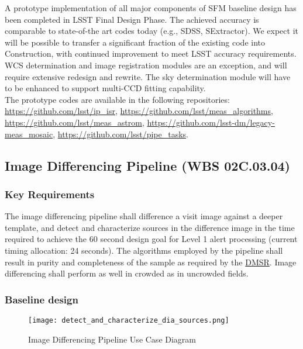 \documentclass[12pt]{article}
\newcommand{\ds}[2]{{\color{blue} \href{https://docushare.lsstcorp.org/docushare/dsweb/Get/#1}{#2}}\xspace}
\newcommand{\DMSR}{\ds{LSE-61}{DMSR}}
\newcommand{\wbsDiffim}{WBS 02C.03.04}
\begin{document}
A prototype implementation of all major components of SFM baseline design has been completed in LSST Final Design Phase. The achieved accuracy is comparable to state-of-the art codes today (e.g., SDSS, SExtractor). We expect it will be possible to transfer a significant fraction of the existing code into Construction, with continued improvement to meet LSST accuracy requirements.
\\

WCS determination and image registration modules are an exception, and will require extensive redesign and rewrite. The sky determination module will have to be enhanced to support multi-CCD fitting capability.
\\

The prototype codes are available in the following repositories: \url{https://github.com/lsst/ip_isr}, \url{https://github.com/lsst/meas_algorithms}, \url{https://github.com/lsst/meas_astrom}, \url{https://github.com/lsst-dm/legacy-meas_mosaic}, \url{https://github.com/lsst/pipe_tasks}.

\clearpage

\subsection{Image Differencing Pipeline (\wbsDiffim)}

\subsubsection{Key Requirements}

The image differencing pipeline shall difference a visit image against a deeper template, and detect and characterize sources in the difference image in the time required to achieve the 60 second design goal for Level 1 alert processing (current timing allocation: 24 seconds). The algorithms employed by the pipeline shall result in purity and completeness of the sample as required by the \DMSR\@. Image differencing shall perform as well in crowded as in uncrowded fields.

\subsubsection{Baseline design}

\begin{figure}
\texttt{[image: detect\_and\_characterize\_dia\_sources.png]}
\caption{Image Differencing Pipeline Use Case Diagram\label{fig:diffimUML}}
\end{figure}
\end{document}
